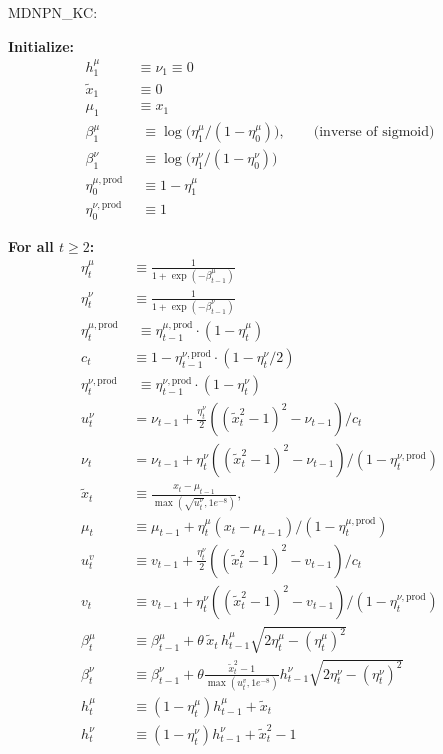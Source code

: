 \documentclass{article}
\begin{document}
	{\large MDNPN\_KC:}
	
	\medskip
	
	
	
	\textbf{Initialize:}
	\begin{align*}
		h_1^\mu &\equiv  \nu_1  \equiv0 \\
		\tilde{x}_1 & \equiv 0 \\
		\mu_1 &\equiv x_1\\
		{\beta_1^\mu} \,&\,\,  { \equiv \log\big(\eta_1^\mu/(1-\eta_0^\mu)\big) , \qquad\textrm{(inverse of sigmoid)}} \\
		{\beta_1^\nu} \,&\,\,  {\equiv \log\big(\eta_1^\nu/(1-\eta_0^\nu)\big)} \\
		{\eta^{\mu, \mathrm{prod}}_0} \,&\,\,{ \equiv 1-\eta^\mu_1}\\
		{\eta^{\nu, \mathrm{prod}}_0} \,&\,\,{ \equiv 1}
	\end{align*}
	
	\textbf{For all $t \geq 2$:}
	\begin{align}
		\eta_t^\mu  &\equiv \frac{1}{1 + \exp(-\beta_{t-1}^\mu)} \\
		\eta_t^\nu  &\equiv \frac{1}{1 + \exp(-\beta_{t-1}^\nu)} \\
		{\eta^{\mu, \mathrm{prod}}_t} \,&\,\,{\equiv \eta^{\mu, \mathrm{prod}}_{t-1} \cdot (1 - \eta_{t}^\mu)} \\
		c_t & \equiv 1-\eta^{\nu, \mathrm{prod}}_{t-1} \cdot (1 - \eta_{t}^\nu/2)\\
		{\eta^{\nu, \mathrm{prod}}_t} \,&\,\,{\equiv \eta^{\nu, \mathrm{prod}}_{t-1} \cdot (1 - \eta_{t}^\nu)} \\
		u^\nu_t &= \nu_{t-1} + \frac{\eta_{t}^\nu}2 \left( \left( \tilde{x}_t^2 - 1 \right)^2 - \nu_{t-1} \right) { / c_t}\\
		\nu_t &= \nu_{t-1} + \eta_{t}^\nu \left( \left( \tilde{x}_t^2 - 1 \right)^2 - \nu_{t-1} \right) { / (1 - \eta^{\nu, \mathrm{prod}}_t)}\\
		\tilde{x}_t &\equiv \frac{x_t -\mu_{t-1}}{\max\left( \sqrt{u^\nu_t}, 1e^{-8} \right)}, \\
		\mu_t &\equiv \mu_{t-1} + \eta_{t}^\mu (x_t - \mu_{t-1}) {/(1 - \eta^{\mu, \mathrm{prod}}_{t})} \\
		u^v_t &\equiv v_{t-1} + \frac{\eta_t^ \nu}2 \left(\left(\tilde{x}_t^2-1\right)^2 - v_{t-1}\right) { / c_t}  \\
		v_t &\equiv v_{t-1} + \eta_t^ \nu \left(\left(\tilde{x}_t^2-1\right)^2 - v_{t-1}\right) { / (1 - \eta^{\nu, \mathrm{prod}}_t)}  \\
		\beta_t^\mu &\equiv \beta_{t-1}^\mu + \theta\, \tilde{x}_t\, h_{t-1}^\mu \sqrt{2 \eta_{t}^\mu - (\eta_{t}^\mu)^2} \\
		\beta_t^\nu &\equiv \beta_{t-1}^\nu + \theta \frac{\tilde{x}_t^2 - 1}{\max\left( u^v_t , 1e^{-8} \right)} h_{t-1}^\nu \sqrt{2 \eta_{t}^\nu - (\eta_{t}^\nu)^2} \\
		h_t^\mu &\equiv (1 - \eta_{t}^\mu) h_{t-1}^\mu + \tilde{x}_t \\
		h_t^\nu &\equiv (1 - \eta_{t}^\nu) h_{t-1}^\nu + \tilde{x}_t^2 -1
	\end{align}
	
	
	
	
	
	
\end{document}
